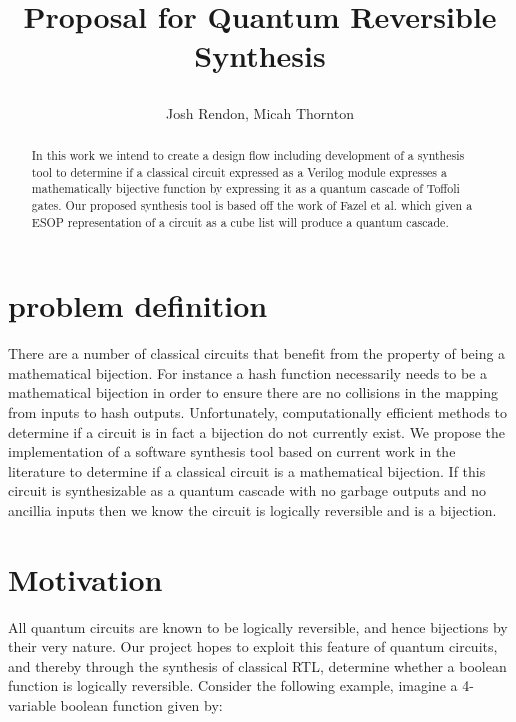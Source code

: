 \documentclass{IEEEtran}
\title {\author{ Josh Rendon, Micah Thornton} Proposal for Quantum Reversible Synthesis}
\begin{document}
\maketitle{}
\begin{abstract}
In this work we intend to create a design flow including development of a synthesis tool to determine if a classical circuit expressed as a Verilog module expresses a mathematically bijective function by expressing it as a quantum cascade of Toffoli gates.
Our proposed synthesis tool is based off the work of Fazel et al. \cite{4313212} which given a ESOP representation of a circuit as a cube list will produce a quantum cascade. 
\end{abstract}
\section{problem definition}
There are a number of classical circuits that benefit from the property of being a mathematical bijection. 
For instance a hash function necessarily needs to be a mathematical bijection in order to ensure there are no collisions in the mapping from inputs to hash outputs. 
Unfortunately, computationally efficient methods to determine if a circuit is in fact a bijection do not currently exist.
We propose the implementation of a software synthesis tool based on current work in the literature to determine if a classical circuit is a mathematical bijection.
If this circuit is synthesizable as a quantum cascade with no garbage outputs and no ancillia inputs then we know the circuit is logically reversible and is a bijection.
\section{Motivation}
All quantum circuits are known to be logically reversible, and hence bijections by their very nature. 
Our project hopes to exploit this feature of quantum circuits, and thereby through the synthesis of classical RTL, determine whether a boolean function is logically reversible. 
Consider the following example, imagine a 4-variable boolean function given by: 
\end{document}
